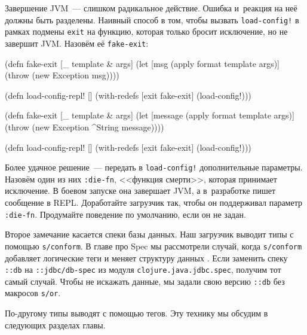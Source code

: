 Завершение JVM~--- слишком радикальное действие. Ошибка и~реакция на неё должны
быть разделены. Наивный способ в том, чтобы вызвать \verb|load-config!| в рамках
подмены \verb|exit| на функцию, которая только бросит исключение, но не завершит
JVM. Назовём её \verb|fake-exit|:

\ifnarrow

\begin{english}
  \begin{clojure}
(defn fake-exit
  [_ template & args]
  (let [msg (apply format template args)]
    (throw (new Exception msg))))

(defn load-config-repl! []
  (with-redefs [exit fake-exit]
    (load-config!)))
  \end{clojure}
\end{english}

\else

\begin{english}
  \begin{clojure}
(defn fake-exit
  [_ template & args]
  (let [message (apply format template args)]
    (throw (new Exception ^String message))))

(defn load-config-repl! []
  (with-redefs [exit fake-exit]
    (load-config!)))
  \end{clojure}
\end{english}

\fi


Более удачное решение~--- передать в \texttt{load-con\-fig!} дополнительные
параметры. Назовём один из них \verb|:die-fn|, <<функция смерти>>, которая
принимает исключение. В боевом запуске она завершает JVM, а в~разработке пишет
сообщение в REPL. Доработайте загрузчик так, чтобы он поддерживал параметр
\verb|:die-fn|. Продумайте поведение по умолчанию, если он не задан.

Второе замечание касается спеки базы данных. Наш загрузчик выводит типы с
помощью \verb|s/conform|. В главе про Spec мы рассмотрели случай, когда
\verb|s/conform| добавляет логические теги и меняет структуру
данных . Если заменить спеку \verb|::db| на
\verb|::jdbc/db-spec| из модуля \texttt{clojure.java.jdbc.spec}, получим тот
самый случай. Чтобы не искажать данные, мы задали свою версию \verb|::db| без
макросов \verb|s/or|.


По-другому типы выводят с помощью тегов. Эту технику мы обсудим в следующих
разделах главы.


